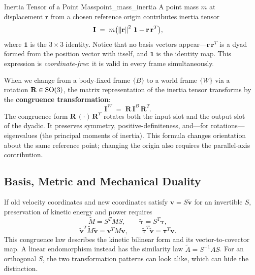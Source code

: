 \begin{example}{Inertia Tensor of a Point Mass}{point_mass_inertia}
A point mass $m$ at displacement $\mathbf r$ from a chosen reference origin contributes
inertia tensor
\begin{equation}\label{eq:point-mass-inertia}
  \mathbf{I}
  \;=\;
  m\bigl(\left\lVert \mathbf{r} \right\rVert^{2}\,\mathbf{1}
         - \mathbf{r}\,\mathbf{r}^{T}\bigr),
\end{equation}
where $\mathbf{1}$ is the $3\times3$ identity.  Notice that no
basis vectors appear---$\mathbf{r}\,\mathbf{r}^{T}$ is a dyad
formed from the position vector with itself, and $\mathbf{1}$
is the identity map. This expression is \emph{coordinate-free}: it is valid in every
frame simultaneously.
\end{example}

When we change from a body-fixed frame $\{B\}$ to a world frame
$\{W\}$ via a rotation $\mathbf{R}\in\mathrm{SO}(3)$, the matrix
representation of the inertia tensor transforms by the
\textbf{congruence transformation}:
\begin{equation}\label{eq:congruence}
  \mathbf{I}^{W}
  \;=\;
  \mathbf{R}\,\mathbf{I}^{B}\,\mathbf{R}^{T}.
\end{equation}
The congruence form $\mathbf{R}\,(\cdot)\,\mathbf{R}^{T}$
rotates both the input slot and the output slot of the dyadic.  It
preserves symmetry, positive-definiteness, and---for rotations---eigenvalues
(the principal moments of inertia). This formula changes orientation about the same reference point; changing the origin also requires the parallel-axis contribution.

\subsection{Basis, Metric and Mechanical Duality}

If old velocity coordinates and new coordinates satisfy $\mathbf v=S\widetilde{\mathbf v}$ for an invertible $S$, preservation of kinetic energy and power requires
\[
\widetilde M=S^TMS,\qquad
\widetilde{\boldsymbol\tau}=S^T\boldsymbol\tau,
\]
\[
\widetilde{\mathbf v}^T\widetilde M\widetilde{\mathbf v}
=\mathbf v^TM\mathbf v,\qquad
\widetilde{\boldsymbol\tau}^T\widetilde{\mathbf v}
=\boldsymbol\tau^T\mathbf v.
\]
This congruence law describes the kinetic bilinear form and its vector-to-covector map. A linear endomorphism instead has the similarity law $\widetilde A=S^{-1}AS$. For an orthogonal $S$, the two transformation patterns can look alike, which can hide the distinction.


